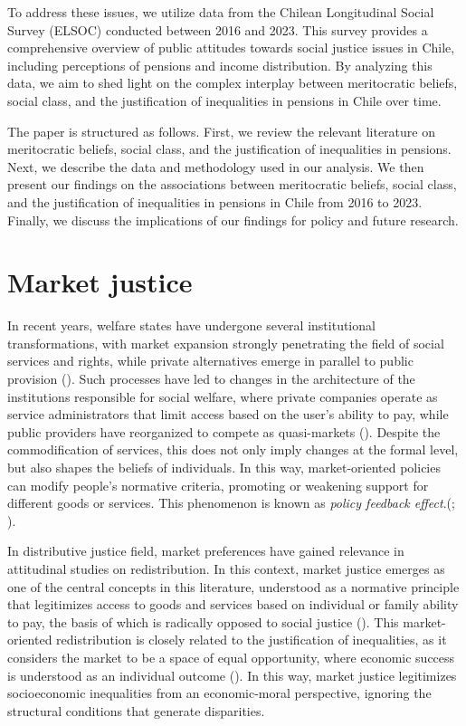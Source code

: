 \documentclass[
  12pt,
]{article}
\begin{document}
To address these issues, we utilize data from the Chilean Longitudinal
Social Survey (ELSOC) conducted between 2016 and 2023. This survey
provides a comprehensive overview of public attitudes towards social
justice issues in Chile, including perceptions of pensions and income
distribution. By analyzing this data, we aim to shed light on the
complex interplay between meritocratic beliefs, social class, and the
justification of inequalities in pensions in Chile over time.

The paper is structured as follows. First, we review the relevant
literature on meritocratic beliefs, social class, and the justification
of inequalities in pensions. Next, we describe the data and methodology
used in our analysis. We then present our findings on the associations
between meritocratic beliefs, social class, and the justification of
inequalities in pensions in Chile from 2016 to 2023. Finally, we discuss
the implications of our findings for policy and future research.

\section{Market justice}\label{market-justice}

In recent years, welfare states have undergone several institutional
transformations, with market expansion strongly penetrating the field of
social services and rights, while private alternatives emerge in
parallel to public provision
().
Such processes have led to changes in the architecture of the
institutions responsible for social welfare, where private companies
operate as service administrators that limit access based on the user's
ability to pay, while public providers have reorganized to compete as
quasi-markets (). Despite the
commodification of services, this does not only imply changes at the
formal level, but also shapes the beliefs of individuals. In this way,
market-oriented policies can modify people's normative criteria,
promoting or weakening support for different goods or services. This
phenomenon is known as \emph{policy feedback
effect}.(;
).

In distributive justice field, market preferences have gained relevance
in attitudinal studies on redistribution. In this context, market
justice emerges as one of the central concepts in this literature,
understood as a normative principle that legitimizes access to goods and
services based on individual or family ability to pay, the basis of
which is radically opposed to social justice
(). This market-oriented
redistribution is closely related to the justification of inequalities,
as it considers the market to be a space of equal opportunity, where
economic success is understood as an individual outcome
(). In
this way, market justice legitimizes socioeconomic inequalities from an
economic-moral perspective, ignoring the structural conditions that
generate disparities.
\end{document}
